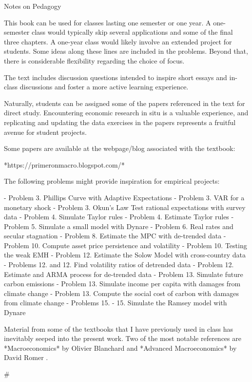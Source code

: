 ﻿\documentclass[oneside]{book}
\begin{document}
Notes on Pedagogy


This book can be used for classes lasting one semester or one year. A one-semester class would typically skip several applications and some of the final three chapters. A one-year class would likely involve an extended project for students. Some ideas along these lines are included in the problems. Beyond that, there is considerable flexibility regarding the choice of focus.

The text includes discussion questions intended to inspire short essays and in-class discussions and foster a more active learning experience.

Naturally, students can be assigned some of the papers referenced in the text for direct study. Encountering economic research in situ is a
valuable experience, and replicating and updating the data exercises in
the papers represents a fruitful avenue for student projects.

Some papers are available at the webpage/blog associated with the textbook:


*https://primeronmacro.blogspot.com/*


The following problems might provide inspiration for empirical projects:

- Problem 3.  Phillips Curve with Adaptive Expectations
- Problem 3.  VAR for a monetary shock
- Problem 3.  Okun's Law
Test rational expectations with survey data
- Problem 4.  Simulate Taylor rules
- Problem 4.  Estimate Taylor rules
- Problem 5.  Simulate a small model with Dynare
- Problem 6.  Real rates and secular stagnation
- Problem 8.  Estimate the MPC with de-trended data
- Problem 10.  Compute asset price persistence and volatility
- Problem 10.  Testing the weak EMH
- Problem 12.  Estimate the Solow Model with cross-country data
- Problems 12. and 12. Find volatility ratios of detrended data
- Problem 12.  Estimate and ARMA process for de-trended data
- Problem 13.  Simulate future carbon emissions
- Problem 13.  Simulate income per capita with damages from climate change
- Problem 13.  Compute the social cost of carbon with damages from climate change
- Problems 15. - 15. Simulate the Ramsey model with Dynare

Material from some of the textbooks that I have previously used in class has
inevitably seeped into the present work. Two of the most notable references
are *Macroeconomics* by Olivier Blanchard  and *Advanced Macroeconomics* by David Romer .



#
\end{document}
